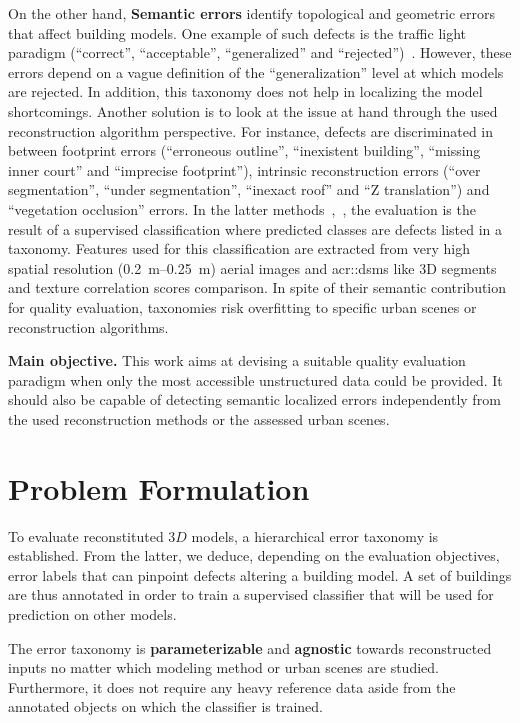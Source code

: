 \documentclass[runningheads]{llncs}
\begin{document}
On the other hand, \textbf{Semantic errors} identify topological and geometric errors that affect building models. One example of such defects is the traffic light paradigm (``correct'', ``acceptable'', ``generalized'' and ``rejected'')~\cite{boudet2006supervised}. However, these errors depend on a vague definition of the ``generalization'' level at which models are rejected. In addition, this taxonomy does not help in localizing the model shortcomings. Another solution is to look at the issue at hand through the used reconstruction algorithm perspective. For instance, defects are discriminated in~\cite{Michelin2013} between footprint errors (``erroneous outline'', ``inexistent building'', ``missing inner court'' and ``imprecise footprint''), intrinsic reconstruction errors (``over segmentation'', ``under segmentation'', ``inexact roof'' and ``Z translation'') and ``vegetation occlusion'' errors. In the latter methods~\cite{boudet2006supervised},~\cite{Michelin2013}, the evaluation is the result of a supervised classification where predicted classes are defects listed in a taxonomy. Features used for this classification are extracted from very high spatial resolution (\SIrange{0.2}{0.25}{\m}) aerial images and \glspl{acr::dsm} like 3D segments and texture correlation scores comparison. In spite of their semantic contribution for quality evaluation, taxonomies risk overfitting to specific urban scenes or reconstruction algorithms.

\noindent
\textbf{Main objective.}
This work aims at devising a suitable quality evaluation paradigm when only the most accessible unstructured data could be provided. It should also be capable of detecting semantic localized errors independently from the used reconstruction methods or the assessed urban scenes.

\section{Problem Formulation}

To evaluate reconstituted $3D$ models, a hierarchical error taxonomy is established. From the latter, we deduce, depending on the evaluation objectives,
error labels that can pinpoint defects altering a building model. A set of buildings are thus annotated in order to train a supervised classifier that will be used for prediction on other models.

The error taxonomy is \textbf{parameterizable} and \textbf{agnostic} towards reconstructed inputs no matter which modeling method or urban scenes are studied. Furthermore, it does not require any heavy reference data aside from the annotated objects on which the classifier is trained.
\end{document}
